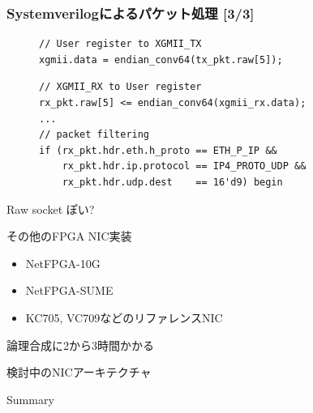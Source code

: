 \documentclass[10pt, compress]{beamer}
\begin{document}
\begin{frame}[fragile,t]
  \frametitle{Systemverilogによるパケット処理 [3/3]}

\vspace{-1em}

\begin{figure}
\begin{tcolorbox}[title=TX]
\begin{verbatim}
// User register to XGMII_TX
xgmii.data = endian_conv64(tx_pkt.raw[5]);
\end{verbatim}
\end{tcolorbox}
%
\begin{tcolorbox}[title=RX]
\begin{verbatim}
// XGMII_RX to User register
rx_pkt.raw[5] <= endian_conv64(xgmii_rx.data);
...
// packet filtering
if (rx_pkt.hdr.eth.h_proto == ETH_P_IP &&
    rx_pkt.hdr.ip.protocol == IP4_PROTO_UDP &&
    rx_pkt.hdr.udp.dest    == 16'd9) begin
\end{verbatim}
\end{tcolorbox}
\end{figure}
\vspace{-.5em}
Raw socket ぽい?
\end{frame}


\begin{frame}[fragile,t]{その他のFPGA NIC実装}
\begin{itemize}
	\item NetFPGA-10G
	\item NetFPGA-SUME
	\item KC705, VC709などのリファレンスNIC
\end{itemize}
論理合成に2から3時間かかる\faMeh
\end{frame}


\begin{frame}[fragile,t]{検討中のNICアーキテクチャ}
\end{frame}


\begin{frame}{Summary}

\end{frame}

\end{document}
